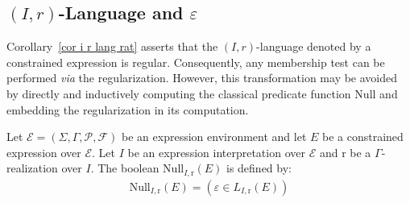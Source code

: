\documentclass[a4paper]{llncs}
\begin{document}
  \subsection{$(I,r)$-Language and $\varepsilon$}
  
  Corollary~\ref{cor i r lang rat} asserts that the $(I,r)$-language denoted by a constrained expression is regular. Consequently, any membership test can be performed \emph{via} the regularization. However, this transformation may be avoided by directly and inductively computing the classical predicate function $\mathrm{Null}$ and embedding the regularization in its computation.
  
  \begin{definition}
    Let $\mathcal{E}=(\Sigma,\Gamma,\mathcal{P},\mathcal{F})$ be an expression environment and let $E$ be a constrained expression over $\mathcal{E}$. Let $I$ be  an expression interpretation over $\mathcal{E}$ and $\mathrm{r}$ be a $\Gamma$-realization over $I$. The boolean $\mathrm{Null}_{I,\mathrm{r}}(E)$ is defined by:
        \begin{align*}
        \mathrm{Null}_{I,\mathrm{r}}(E)=(\varepsilon\in L_{I,\mathrm{r}}(E))
        \end{align*}
  \end{definition}
  
\end{document}
